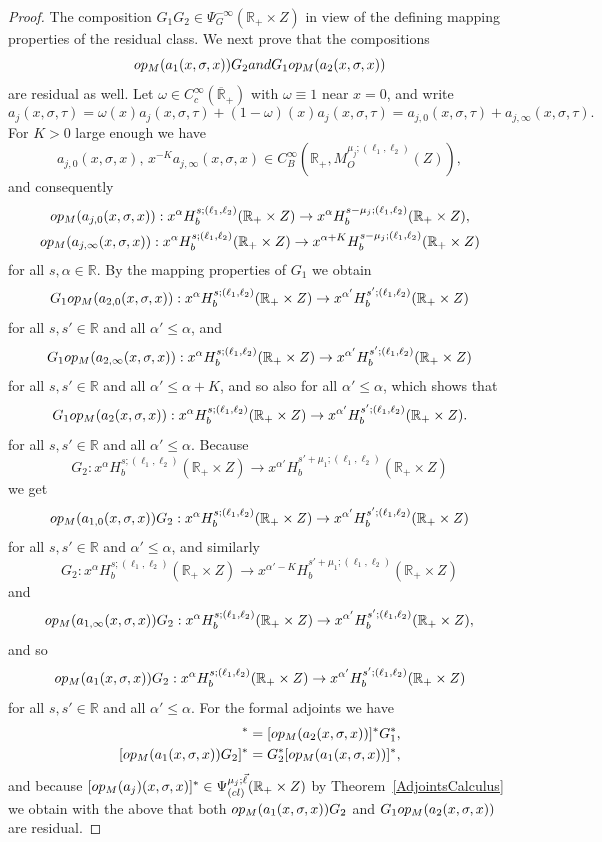 \documentclass[10pt,a4paper]{amsart}
\def\R{\mathbb R}
\def\opm{\textup{op}_{\textit{M}}}
\begin{document}
\begin{proof}
The composition $G_1G_2 \in \Psi^{-\infty}_G(\R_+\times Z)$ in view of the defining mapping properties of the residual class. We next prove that the compositions
$$
\opm(a_1(x,\sigma,x))G_2 \textup{ and } G_1\opm(a_2(x,\sigma,x))
$$
are residual as well. Let $\omega \in C_c^{\infty}(\overline{\R}_+)$ with $\omega \equiv 1$ near $x=0$, and write
$$
a_j(x,\sigma,\tau) = \omega(x) a_j(x,\sigma,\tau) + (1-\omega)(x) a_j(x,\sigma,\tau) = a_{j,0}(x,\sigma,\tau) + a_{j,\infty}(x,\sigma,\tau).
$$
For $K > 0$ large enough we have
$$
a_{j,0}(x,\sigma,x),\, x^{-K}a_{j,\infty}(x,\sigma,x) \in C^{\infty}_B(\R_+,M^{\mu_j;(\ell_1,\ell_2)}_O(Z)),
$$
and consequently
\begin{gather*}
\opm(a_{j,0}(x,\sigma,x)) : x^{\alpha}H^{s;(\ell_1,\ell_2)}_b(\R_+\times Z) \to x^{\alpha}H^{s-\mu_j;(\ell_1,\ell_2)}_b(\R_+\times Z), \\
\opm(a_{j,\infty}(x,\sigma,x)) : x^{\alpha}H^{s;(\ell_1,\ell_2)}_b(\R_+\times Z) \to x^{\alpha+K}H^{s-\mu_j;(\ell_1,\ell_2)}_b(\R_+\times Z)
\end{gather*}
for all $s,\alpha \in \R$. By the mapping properties of $G_1$ we obtain
$$
G_1 \opm(a_{2,0}(x,\sigma,x)) : x^{\alpha}H^{s;(\ell_1,\ell_2)}_b(\R_+\times Z) \to x^{\alpha'}H^{s';(\ell_1,\ell_2)}_b(\R_+\times Z)
$$
for all $s,s' \in \R$ and all $\alpha' \leq \alpha$, and
$$
G_1 \opm(a_{2,\infty}(x,\sigma,x)) : x^{\alpha}H^{s;(\ell_1,\ell_2)}_b(\R_+\times Z) \to x^{\alpha'}H^{s';(\ell_1,\ell_2)}_b(\R_+\times Z)
$$
for all $s,s' \in \R$ and all $\alpha' \leq \alpha + K$, and so also for all $\alpha' \leq \alpha$, which shows that
$$
G_1 \opm(a_{2}(x,\sigma,x)) : x^{\alpha}H^{s;(\ell_1,\ell_2)}_b(\R_+\times Z) \to x^{\alpha'}H^{s';(\ell_1,\ell_2)}_b(\R_+\times Z).
$$
for all $s,s' \in \R$ and all $\alpha' \leq \alpha$. Because
$$
G_2 : x^{\alpha}H^{s;(\ell_1,\ell_2)}_b(\R_+\times Z) \to x^{\alpha'}H^{s'+\mu_1;(\ell_1,\ell_2)}_b(\R_+\times Z)
$$
we get
$$
\opm(a_{1,0}(x,\sigma,x))G_2 : x^{\alpha}H^{s;(\ell_1,\ell_2)}_b(\R_+\times Z) \to x^{\alpha'}H^{s';(\ell_1,\ell_2)}_b(\R_+\times Z)
$$
for all $s,s'  \in \R$ and $\alpha' \leq \alpha$, and similarly
$$
G_2 : x^{\alpha}H^{s;(\ell_1,\ell_2)}_b(\R_+\times Z) \to x^{\alpha'-K}H^{s'+\mu_1;(\ell_1,\ell_2)}_b(\R_+\times Z)
$$
and
$$
\opm(a_{1,\infty}(x,\sigma,x))G_2 : x^{\alpha}H^{s;(\ell_1,\ell_2)}_b(\R_+\times Z) \to x^{\alpha'}H^{s';(\ell_1,\ell_2)}_b(\R_+\times Z),
$$
and so
$$
\opm(a_1(x,\sigma,x))G_2 : x^{\alpha}H^{s;(\ell_1,\ell_2)}_b(\R_+\times Z) \to x^{\alpha'}H^{s';(\ell_1,\ell_2)}_b(\R_+\times Z)
$$
for all $s,s' \in \R$ and all $\alpha' \leq \alpha$. For the formal adjoints we have
\begin{align*}
[G_1\opm(a_2(x,\sigma,x))]^* &= [\opm(a_2(x,\sigma,x))]^*G_1^*, \\
[\opm(a_1(x,\sigma,x))G_2]^* &= G_2^*[\opm(a_1(x,\sigma,x))]^*,
\end{align*}
and because $[\opm(a_j)(x,\sigma,x)]^* \in \Psi^{\mu_j;\vec{\ell}}_{\textup{(cl)}}(\R_+\times Z)$ by Theorem~\ref{AdjointsCalculus} we obtain with the above that both $\opm(a_1(x,\sigma,x))G_2$ and $G_1\opm(a_2(x,\sigma,x))$ are residual.


\end{proof}
\end{document}
